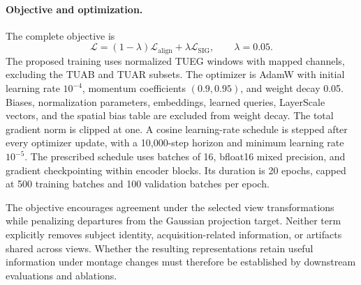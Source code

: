 \documentclass{article}
\begin{document}
\balance
\paragraph{Objective and optimization.}
The complete objective is
\begin{equation}
    \mathcal{L}=(1-\lambda)\mathcal{L}_{\mathrm{align}}
                   +\lambda\mathcal{L}_{\mathrm{SIG}},
    \qquad\lambda=0.05.
    \label{eq:total-objective}
\end{equation}
The proposed training uses normalized TUEG windows with mapped channels,
excluding the TUAB and TUAR subsets. The optimizer is AdamW with
initial learning rate $10^{-4}$, momentum coefficients $(0.9,0.95)$,
and weight decay 0.05. Biases,
normalization parameters, embeddings, learned queries, LayerScale vectors,
and the spatial bias table are excluded from weight decay. The total gradient norm is clipped at one.
A cosine learning-rate schedule is stepped after every optimizer update,
with a 10,000-step horizon and minimum learning rate $10^{-5}$.
The prescribed schedule uses batches of 16, bfloat16 mixed precision, and gradient
checkpointing within encoder blocks. Its duration is 20 epochs, capped at
500 training batches and 100 validation batches per epoch.

The objective encourages agreement under the selected view transformations
while penalizing departures from the Gaussian projection target. Neither
term explicitly removes subject identity, acquisition-related information,
or artifacts shared across views. Whether the resulting representations
retain useful information under montage changes must therefore be
established by downstream evaluations and ablations.
\end{document}
